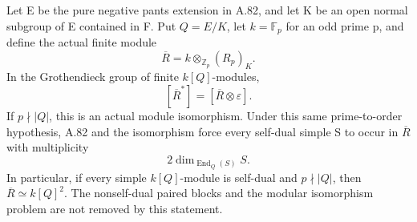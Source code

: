 Let E be the pure negative pants extension in A.82, and
let K be an open normal subgroup of E contained in F.
Put \(Q=E/K\), let \(k=\mathbb F_p\) for an odd
prime p, and define the actual finite module
\[
             \overline R=k\otimes_{\mathbb Z_p}(R_p)_K.
 \tag{A.83.1}
\]
In the Grothendieck group of finite \(k[Q]\)-modules,
\[
                    [\overline R^*]=[\overline R\otimes\varepsilon].
 \tag{A.83.2}
\]
If \(p\nmid|Q|\), this is an actual module isomorphism.
Under this same prime-to-order hypothesis, A.82 and the
isomorphism force every self-dual simple S to
occur in \(\overline R\) with multiplicity
\[
                         2\dim_{\operatorname{End}_Q(S)}S.
 \tag{A.83.3}
\]
In particular, if every simple \(k[Q]\)-module is
self-dual and \(p\nmid|Q|\), then
\(\overline R\simeq k[Q]^2\).
The nonself-dual paired blocks and the modular isomorphism
problem are not removed by this statement.


